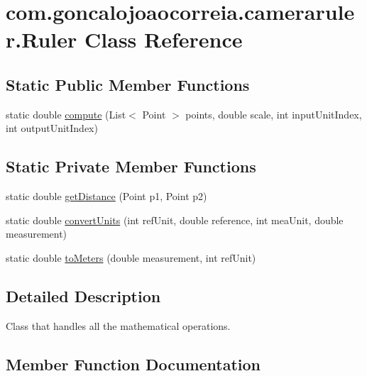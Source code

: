 \hypertarget{classcom_1_1goncalojoaocorreia_1_1cameraruler_1_1_ruler}{}\section{com.\+goncalojoaocorreia.\+cameraruler.\+Ruler Class Reference}
\label{classcom_1_1goncalojoaocorreia_1_1cameraruler_1_1_ruler}
\subsection*{Static Public Member Functions}
\begin{DoxyCompactItemize}
\item 
static double \hyperlink{classcom_1_1goncalojoaocorreia_1_1cameraruler_1_1_ruler_a8e725d0dca195b17882238f7254a5a5a}{compute} (List$<$ Point $>$ points, double scale, int input\+Unit\+Index, int output\+Unit\+Index)
\end{DoxyCompactItemize}
\subsection*{Static Private Member Functions}
\begin{DoxyCompactItemize}
\item 
static double \hyperlink{classcom_1_1goncalojoaocorreia_1_1cameraruler_1_1_ruler_a62454cde098145403b61a8ec62151309}{get\+Distance} (Point p1, Point p2)
\item 
static double \hyperlink{classcom_1_1goncalojoaocorreia_1_1cameraruler_1_1_ruler_af1f5662547b2d14b8637ceb48cc0de30}{convert\+Units} (int ref\+Unit, double reference, int mea\+Unit, double measurement)
\item 
static double \hyperlink{classcom_1_1goncalojoaocorreia_1_1cameraruler_1_1_ruler_a5c46ee6c3d51358f7d5448fb58626585}{to\+Meters} (double measurement, int ref\+Unit)
\end{DoxyCompactItemize}


\subsection{Detailed Description}
Class that handles all the mathematical operations. 

\subsection{Member Function Documentation}
\mbox{\label{classcom_1_1goncalojoaocorreia_1_1cameraruler_1_1_ruler_a8e725d0dca195b17882238f7254a5a5a}} 

